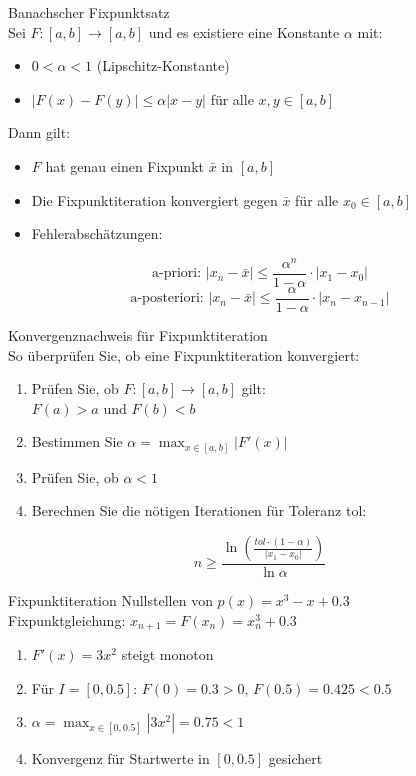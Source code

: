 \begin{lemma}{Banachscher Fixpunktsatz}\\
Sei $F:[a,b] \rightarrow [a,b]$ und es existiere eine Konstante $\alpha$ mit:
\begin{itemize}
    \item $0 < \alpha < 1$ (Lipschitz-Konstante)
    \item $|F(x)-F(y)| \leq \alpha|x-y|$ für alle $x,y \in [a,b]$
\end{itemize}
\vspace{1mm}
Dann gilt:
\begin{itemize}
    \item $F$ hat genau einen Fixpunkt $\bar{x}$ in $[a,b]$
    \item Die Fixpunktiteration konvergiert gegen $\bar{x}$ für alle $x_0 \in [a,b]$
    \item Fehlerabschätzungen:
\end{itemize}
$$\text{a-priori: } |x_n-\bar{x}| \leq \frac{\alpha^n}{1-\alpha} \cdot |x_1-x_0|$$
$$\text{a-posteriori: } |x_n-\bar{x}| \leq \frac{\alpha}{1-\alpha} \cdot |x_n-x_{n-1}|$$
\end{lemma}

\begin{KR}{Konvergenznachweis für Fixpunktiteration}\\
So überprüfen Sie, ob eine Fixpunktiteration konvergiert:
\begin{enumerate}
    \item Prüfen Sie, ob $F:[a,b] \rightarrow [a,b]$ gilt:\\
           $F(a) > a$ und $F(b) < b$
    \item Bestimmen Sie $\alpha = \max_{x \in [a,b]} |F'(x)|$
    \item Prüfen Sie, ob $\alpha < 1$
    \item Berechnen Sie die nötigen Iterationen für Toleranz tol:
\end{enumerate}
\vspace{2mm}
$$n \geq \frac{\ln(\frac{tol \cdot (1-\alpha)}{|x_1-x_0|})}{\ln \alpha}$$
\end{KR}

\begin{example2}{Fixpunktiteration} Nullstellen von $p(x)=x^3-x+0.3$\\
Fixpunktgleichung: $x_{n+1} = F(x_n) = x_n^3 + 0.3$
\begin{enumerate}
    \item $F'(x) = 3x^2$ steigt monoton
    \item Für $I=[0,0.5]$: $F(0)=0.3 > 0$, $F(0.5)=0.425 < 0.5$
    \item $\alpha = \max_{x \in [0,0.5]} |3x^2| = 0.75 < 1$
    \item Konvergenz für Startwerte in $[0,0.5]$ gesichert
\end{enumerate}
\end{example2}

